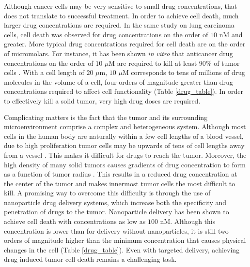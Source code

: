 Although cancer cells may be very sensitive to small drug concentrations, that does not translate to successful treatment. In order to achieve cell death, much larger drug concentrations are required. In the same study on lung carcinoma cells, cell death was observed for drug concentrations on the order of $10$ nM and greater. More typical drug concentrations required for cell death are on the order of micromolars. For instance, it has been shown \textit{in vitro} that anticancer drug concentrations on the order of $10$ $\mu$M are required to kill at least $90\%$ of tumor cells \cite{grantab2006penetration}. With a cell length of $20$ $\mu$m, $10$ $\mu$M corresponds to tens of millions of drug molecules in the volume of a cell, four orders of magnitude greater than drug concentrations required to affect cell functionality (Table \ref{drug_table}). In order to effectively kill a solid tumor, very high drug doses are required.

Complicating matters is the fact that the tumor and its surrounding microenvironment comprise a complex and heterogeneous system. Although most cells in the human body are naturally within a few cell lengths of a blood vessel, due to high proliferation tumor cells may be upwards of tens of cell lengths away from a vessel \cite{minchinton2006drug}. This makes it difficult for drugs to reach the tumor. Moreover, the high density of many solid tumors causes gradients of drug concentration to form as a function of tumor radius \cite{kwon2012analysis}. This results in a reduced drug concentration at the center of the tumor and makes innermost tumor cells the most difficult to kill. A promising way to overcome this difficulty is through the use of nanoparticle drug delivery systems, which increase both the specificity and penetration of drugs to the tumor. Nanoparticle delivery has been shown \cite{malam2009liposomes} to achieve cell death with concentrations as low as $100$ nM. Although this concentration is lower than for delivery without nanoparticles, it is still two orders of magnitude higher than the minimum concentration that causes physical changes in the cell (Table \ref{drug_table}). Even with targeted delivery, achieving drug-induced tumor cell death remains a challenging task.

